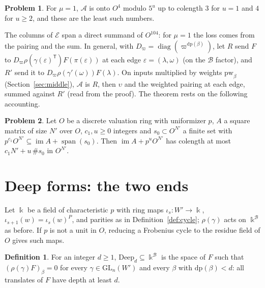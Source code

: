 \documentclass[reqno]{amsart}
\numberwithin{equation}{section}
\theoremstyle{plain}
\theoremstyle{definition}
\newtheorem{problem}{Problem}[section]
\newtheorem{definition}[theorem]{Definition}
\theoremstyle{remark}
\newcommand{\GL}{\mathrm{GL}}
\newcommand{\Bc}{\mathcal B}
\newcommand{\Ac}{\mathcal A}
\newcommand{\Ec}{\mathcal E}
\newcommand{\dpt}{\mathrm{dp}}
\newcommand{\Deep}{\mathrm{Deep}}
\begin{document}
\begin{problem}\label{pr:colength-model}
For \(\mu = 1\), \(\Ac\) is onto \(O^4\) modulo \(5^u\) up to colength \(3\) for \(u = 1\) and \(4\) for \(u \ge 2\), and these are the least such numbers.
\end{problem}

The columns of \(\Ec\) span a direct summand of \(O^{104}\): for \(\mu = 1\) the loss comes from the pairing and the sum.  In general, with \(D_\varpi = \operatorname{diag}(\varpi^{\dpt(\beta)})\), let \(R\) send \(F\) to \(D_\varpi\rho(\gamma(\varepsilon)^{\mathsf T})F(\pi(\varepsilon))\) at each edge \(\varepsilon = (\lambda, \omega)\) (on the \(\Bc\) factor), and \(R'\) send it to \(D_\varpi\rho(\gamma'(\omega))F(\lambda)\).  On inputs multiplied by weights \(\mathrm{pw}_\beta\) (Section~\ref{sec:middle}), \(\Ac\) is \(R\), then \(\upsilon\) and the weighted pairing at each edge, summed against \(R'\) (read from the proof).  The theorem rests on the following accounting.

\begin{problem}\label{pr:nakayama}
Let \(O\) be a discrete valuation ring with uniformizer \(p\), \(A\) a square matrix of size \(N'\) over \(O\), \(c_1, u \ge 0\) integers and \(s_0 \subset O^{N'}\) a finite set with \(p^{c_1}O^{N'} \subseteq \operatorname{im}A + \operatorname{span}(s_0)\).  Then \(\operatorname{im}A + p^uO^{N'}\) has colength at most \(c_1N' + u\,\#s_0\) in \(O^{N'}\).
\end{problem}

\section{Deep forms: the two ends}\label{sec:ends}

Let \(\Bbbk\) be a field of characteristic \(p\) with ring maps \(\iota_s \colon W' \to \Bbbk\), \(\iota_{s+1}(w) = \iota_s(w)^P\), and parities as in Definition~\ref{def:cycle}; \(\rho(\gamma)\) acts on \(\Bbbk^{\Bc}\) as before.  If \(p\) is not a unit in \(O\), reducing a Frobenius cycle to the residue field of \(O\) gives such maps.

\begin{definition}\label{def:deep}
For an integer \(d \ge 1\), \(\Deep_d \subseteq \Bbbk^{\Bc}\) is the space of \(F\) such that \((\rho(\gamma)F)_\beta = 0\) for every \(\gamma \in \GL_n(W')\) and every \(\beta\) with \(\dpt(\beta) < d\): all translates of \(F\) have depth at least \(d\).
\end{definition}
\end{document}
